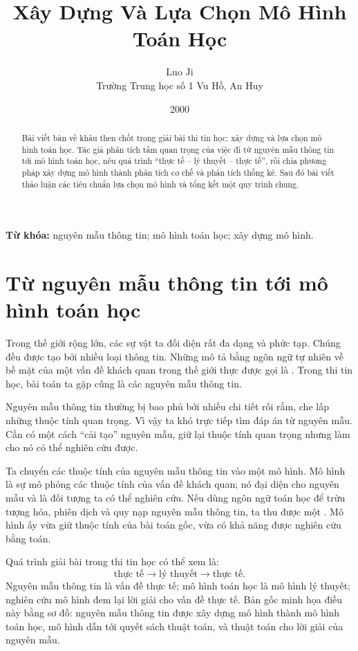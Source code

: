 \documentclass[11pt]{article}
\title{Xây Dựng Và Lựa Chọn Mô Hình Toán Học}
\author{Luo Ji\\Trường Trung học số 1 Vu Hồ, An Huy}
\date{2000}
\begin{document}
\maketitle


\begin{abstract}
Bài viết bàn về khâu then chốt trong giải bài thi tin học: xây dựng và lựa
chọn mô hình toán học. Tác giả phân tích tầm quan trọng của việc đi từ nguyên
mẫu thông tin tới mô hình toán học, nêu quá trình ``thực tế -- lý thuyết --
thực tế'', rồi chia phương pháp xây dựng mô hình thành phân tích cơ chế và
phân tích thống kê. Sau đó bài viết thảo luận các tiêu chuẩn lựa chọn mô hình
và tổng kết một quy trình chung.
\end{abstract}

\noindent\textbf{Từ khóa:} nguyên mẫu thông tin; mô hình toán học; xây dựng mô
hình.

\section{Từ nguyên mẫu thông tin tới mô hình toán học}

Trong thế giới rộng lớn, các sự vật ta đối diện rất đa dạng và phức tạp. Chúng
đều được tạo bởi nhiều loại thông tin. Những mô tả bằng ngôn ngữ tự nhiên về
bề mặt của một vấn đề khách quan trong thế giới thực được gọi là
. Trong thi tin học, bài toán ta gặp cũng là các
nguyên mẫu thông tin.

Nguyên mẫu thông tin thường bị bao phủ bởi nhiều chi tiết rối rắm, che lấp
những thuộc tính quan trọng. Vì vậy ta khó trực tiếp tìm đáp án từ nguyên mẫu.
Cần có một cách ``cải tạo'' nguyên mẫu, giữ lại thuộc tính quan trọng nhưng
làm cho nó có thể nghiên cứu được.

Ta chuyển các thuộc tính của nguyên mẫu thông tin vào một mô hình. Mô hình là
sự mô phỏng các thuộc tính của vấn đề khách quan; nó đại diện cho nguyên mẫu
và là đối tượng ta có thể nghiên cứu. Nếu dùng ngôn ngữ toán học để trừu tượng
hóa, phiên dịch và quy nạp nguyên mẫu thông tin, ta thu được một
. Mô hình ấy vừa giữ thuộc tính của bài toán gốc, vừa
có khả năng được nghiên cứu bằng toán.

Quá trình giải bài trong thi tin học có thể xem là:
\[
  \text{thực tế}\longrightarrow \text{lý thuyết}\longrightarrow \text{thực tế}.
\]
Nguyên mẫu thông tin là vấn đề thực tế; mô hình toán học là mô hình lý thuyết;
nghiên cứu mô hình đem lại lời giải cho vấn đề thực tế. Bản gốc minh họa điều
này bằng sơ đồ: nguyên mẫu thông tin được xây dựng mô hình thành mô hình toán
học, mô hình dẫn tới quyết sách thuật toán, và thuật toán cho lời giải của
nguyên mẫu.
\end{document}

